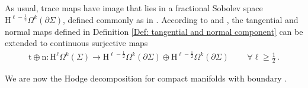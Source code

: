 \begin{remark}\label{Rmk: extension of tangential and normal maps to Sobolev spaces}
	As usual, trace maps have image that lies in a fractional Sobolev space $\mathrm{H}^{\ell-\frac{1}{2}}\Omega^k(\partial\Sigma)$, defined commonly as in \cite{Lions-Magenes-72}.  According to \cite[p. 171]{Georgescu-79} and \cite[Sec. 2]{Weck-04}, the tangential and normal maps defined in Definition \ref{Def: tangential and normal component} can be extended to continuous surjective maps
	\begin{align}\label{Eqn: Sobolev tangential and normal trace maps}
		\mathrm{t}\oplus\mathrm{n}\colon
		\mathrm{H}^\ell\Omega^k(\Sigma)\to
		\mathrm{H}^{\ell-\frac{1}{2}}\Omega^k(\partial\Sigma)\oplus
		\mathrm{H}^{\ell-\frac{1}{2}}\Omega^k(\partial\Sigma)\,\qquad\forall\ell\geq\frac{1}{2}\,.
	\end{align}
\end{remark}
We are now  the Hodge decomposition for compact manifolds with boundary \cite[Thm. 2.4.2]{Schwarz-95}.
